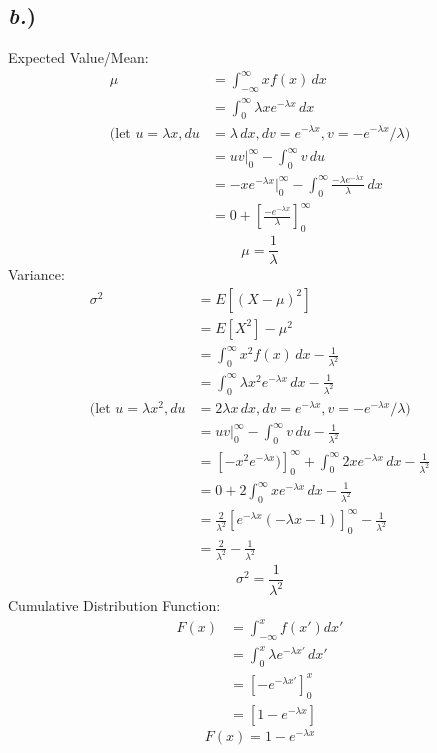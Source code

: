 \documentclass{article}
\begin{document}
\subsection*{\textit{b.})}
Expected Value/Mean: 
\begin{align*}
\mu &= \int_{-\infty}^{\infty} x f(x) \, dx \\
	&= \int_0^{\infty} \lambda x e^{-\lambda x} \, dx  \\
(\text{let }u = \lambda x, du &= \lambda\,dx, dv = e^{-\lambda x}, v = -e^{-\lambda x}/\lambda)\\
	&= uv|_0^{\infty} - \int_0^{\infty}v \, du \\
	&= -x e^{-\lambda x}\bigg|_0^{\infty} - \int_0^{\infty} \frac{-\lambda e^{-\lambda x}}{\lambda} \, dx \\
	&= 0 + \left[ \frac{-e^{-\lambda x}}{\lambda} \right]_0^{\infty}
\end{align*}
$$\boxed{ \mu = \frac{1}{\lambda} }$$
Variance:
\begin{align*}
\sigma^2	&= E[(X-\mu)^2] \\
			&= E[X^2] - \mu^2 \\
			&= \int_0^{\infty}x^2 f(x) \, dx - \frac{1}{\lambda^2}  \\
			&= \int_0^{\infty}\lambda x^2 e^{-\lambda x} \, dx - \frac{1}{\lambda^2}  \\
(\text{let }u = \lambda x^2, du &= 2\lambda x\,dx, dv = e^{-\lambda x}, v = -e^{-\lambda x}/\lambda)\\
			&= uv|_0^{\infty} - \int_0^{\infty}v \, du - \frac{1}{\lambda^2} \\
			&= \left[ -x^2 e^{-\lambda x}) \right]_0^{\infty} + \int_0^{\infty} 2 x e^{-\lambda x} \, dx - \frac{1}{\lambda^2}\\
			&= 0 + 2 \int_0^{\infty} x e^{-\lambda x} \, dx - \frac{1}{\lambda^2}\\
			&= \frac{2}{\lambda^2} \left[ e^{-\lambda x}(-\lambda x-1) \right]_0^{\infty} - \frac{1}{\lambda^2}\\
			&= \frac{2}{\lambda^2} - \frac{1}{\lambda^2}
\end{align*}
$$\boxed{ \sigma^2 = \frac{1}{\lambda^2} }$$
Cumulative Distribution Function:
\begin{align*}
F(x)	&= \int_{-\infty}^{x} f(x') dx' \\
		&= \int_0^x \lambda e^{-\lambda x'} \, dx' \\
		&= \left[-e^{-\lambda x'}\right]_0^x \\
		&= \left[1 -e^{-\lambda x} \right]
\end{align*}
$$\boxed{ F(x) = 1 -e^{-\lambda x} }$$
\end{document}
